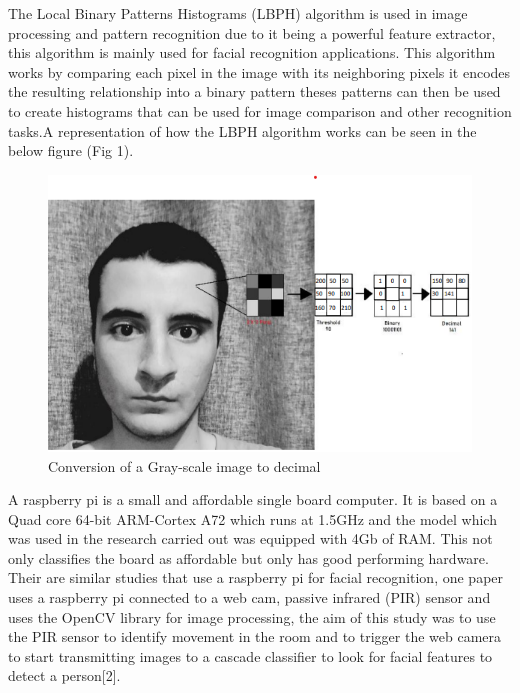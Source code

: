 \documentclass[journal]{IEEEtran}
\begin{document}
The Local Binary Patterns Histograms (LBPH) algorithm is used in image processing and pattern recognition due to it being a powerful feature extractor, this algorithm is mainly used for facial recognition applications. This algorithm works by comparing each pixel in the image with its neighboring pixels it encodes the resulting relationship into a binary pattern theses patterns can then be used to create histograms that can be used for image comparison and other recognition tasks.A representation of how 
the LBPH algorithm works can be seen in the below figure (Fig 1).

\begin{figure}[H]
    \centering
    \includegraphics[width=\columnwidth]{./images/Figure1.png}
    \caption{Conversion of a Gray-scale image to decimal}
    \label{fig:my_label}
\end{figure}

A raspberry pi is a small and affordable single board computer. It is based on a Quad core 64-bit ARM-Cortex A72 which runs at 1.5GHz and the model which was used in the research carried out was equipped with 4Gb of RAM. This not only classifies the board as affordable but only has good performing hardware.\\

Their are similar studies that use a raspberry pi for facial recognition, one paper uses a raspberry pi connected to a web cam, passive infrared (PIR) sensor and uses the OpenCV library for image processing, the aim of this study was to use the PIR sensor to identify movement in the room and to trigger the web camera to start transmitting images to a cascade classifier to look for facial features to detect a person[2].\\
\end{document}
